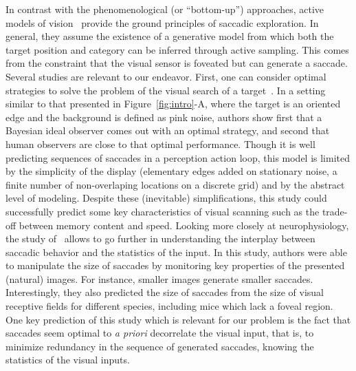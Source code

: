 In contrast with the phenomenological (or ``bottom-up'') approaches, active models of vision~\cite{Najemnik05,Butko2010infomax} provide the ground principles of saccadic exploration. In general, they assume the existence of a generative model from which both the target position and category can be inferred through active sampling. This comes from the constraint that the visual sensor is foveated but can generate a saccade.
Several studies are relevant to our endeavor. First, one can consider optimal strategies to solve the problem of the visual search of a target~\cite{Najemnik05}. In a setting similar to that presented in Figure~\ref{fig:intro}-A, where the target is an oriented edge and the background is defined as pink noise, authors show first that a Bayesian ideal observer comes out with an optimal strategy, and second that human observers are close to that optimal performance. Though it is well predicting sequences of saccades in a perception action loop, this model is limited by the simplicity of the display (elementary edges added on stationary noise, a finite number of non-overlaping locations on a discrete grid) and by the abstract level of modeling. Despite these (inevitable) simplifications, this study could successfully predict some key characteristics of visual scanning such as the trade-off between memory content and speed. Looking more closely at neurophysiology, the study of~\cite{Samonds18} allows to go further in understanding the interplay between saccadic behavior and the statistics of the input. In this study, authors were able to manipulate the size of saccades by monitoring key properties of the presented (natural) images. For instance, smaller images generate smaller saccades. Interestingly, they also predicted the size of saccades from the size of visual receptive fields for different species, including mice which lack a foveal region. One key prediction of this study which is relevant for our problem is the fact that saccades seem optimal to \emph{a priori} decorrelate the visual input, that is, to minimize redundancy in the sequence of generated saccades, knowing the statistics of the visual inputs.

